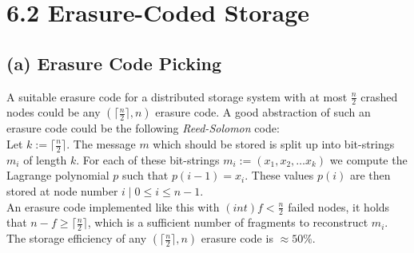 \documentclass{article}
\begin{document}
	\section*{6.2 Erasure-Coded Storage}
	\begin{adjustwidth}{2em}{2em}
		\subsection*{(a) Erasure Code Picking}
		\begin{adjustwidth}{2em}{2em}
			A suitable erasure code for a distributed storage system with at most $\frac{n}{2}$ crashed nodes could be any $(\lceil \frac{n}{2} \rceil , n)$ erasure code. A good abstraction of such an erasure code could be the following \textit{Reed-Solomon} code: \\
			Let $k := \lceil \frac{n}{2} \rceil$. The message $m$ which should be stored is split up into bit-strings $m_i$ of length $k$. For each of these bit-strings $m_i := (x_1, x_2, \ldots x_k)$ we compute the Lagrange polynomial $p$ such that $p(i - 1) = x_i$. These values $p(i)$ are then stored at node number $i \mid 0 \leq i \leq n-1$. \\
			An erasure code implemented like this with $(int) f < \frac{n}{2}$ failed nodes, it holds that $n-f \geq \lceil \frac{n}{2} \rceil$, which is a sufficient number of fragments to reconstruct $m_i$. \\
			The storage efficiency of any $(\lceil \frac{n}{2} \rceil , n)$ erasure code is $\approx 50 \%$.
		\end{adjustwidth}
		\newpage

\end{adjustwidth}
\end{document}
